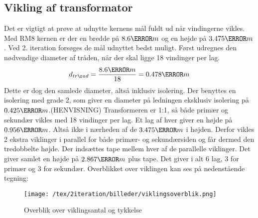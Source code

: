 \subsection{Vikling af transformator}
Det er vigtigt at prøve at udnytte kernens mål fuldt ud når vindingerne vikles. Med RM8 kernen er der en bredde på $8.6\milli m$ og en højde på $3.475\milli m$. Ved 2. iteration forsøges de mål udnyttet bedst muligt.
Først udregnes den nødvendige diameter af tråden, når der skal ligge 18 vindinger per lag. 
\begin{equation} \label{d_trad}
d_{tråd} = \frac{8.6\milli m}{18} = 0.478\milli m
\end{equation}
Dette er dog den samlede diameter, altså inklusiv isolering. Der benyttes en isolering med grade 2, som giver en diameter på ledningen eksklusiv isolering på $0.425\milli m$.(HENVISNING) Transformeren er 1:1, så både primær og sekundær vikles med 18 vindinger per lag. Et lag af hver giver en højde på $0.956\milli m$. Altså ikke i nærheden af de $3.475\milli m$ i højden. Derfor vikles 2 ekstra viklinger i parallel for både primær- og sekundærsiden og får dermed den tredobbelte højde. Der indsættes tape mellem hver af de parallelle viklinger. Det giver samlet en højde på $2.867\milli m$ plus tape. Det giver i alt 6 lag, 3 for primær og 3 for sekundær. Overblikket over viklingen kan ses på nedenstående tegning:
\begin{figure}[H]
	\center
	\texttt{[image: /tex/2iteration/billeder/viklingsoverblik.png]}
	\caption{Overblik over viklingsantal og tykkelse}
	\label{fig: viklingsoverblik}
\end{figure}